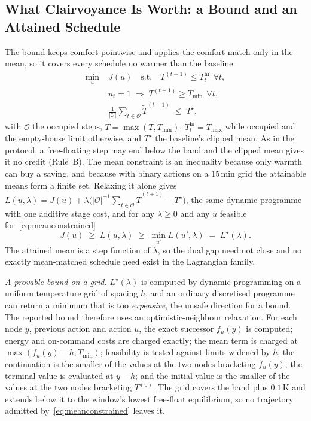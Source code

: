 \documentclass[pdflatex,sn-mathphys-num,iicol]{sn-jnl}
\theoremstyle{thmstyleone}\newtheorem{proposition}{Proposition}\newtheorem{corollary}{Corollary}
\theoremstyle{thmstyletwo}\newtheorem{remark}{Remark}\newtheorem{observation}{Observation}
\theoremstyle{thmstylethree}\newtheorem{definition}{Definition}
\newcommand{\Tmin}{T_{\min}}
\newcommand{\Tmax}{T_{\max}}
\begin{document}
\subsection{What Clairvoyance Is Worth: a Bound and an Attained Schedule}
\label{subsec:bound}

The bound keeps comfort pointwise and applies the comfort match only in the mean, so it covers every schedule no warmer than the baseline:
\begin{equation}
\begin{split}
  \min_{u}\;&J(u)\quad\text{s.t.}\quad
    T^{(t+1)}\le T^{\mathrm{hi}}_t\ \ \forall t,\\
  &u_t=1\;\Rightarrow\;T^{(t+1)}\ge\Tmin\ \ \forall t,\\
  &\tfrac{1}{|\mathcal{O}|}\textstyle\sum_{t\in\mathcal{O}}\tilde T^{(t+1)}
    \;\le\;T^{\star},
\end{split}
\label{eq:meanconstrained}
\end{equation}
with $\mathcal{O}$ the occupied steps, $\tilde T=\max(T,\Tmin)$, $T^{\mathrm{hi}}_t=\Tmax$ while occupied and the empty-house limit otherwise, and $T^{\star}$ the baseline's clipped mean. As in the protocol, a free-floating step may end below the band and the clipped mean gives it no credit (Rule~B). The mean constraint is an inequality because only warmth can buy a saving, and because with binary actions on a $15\,$min grid the attainable means form a finite set. Relaxing it alone gives $L(u,\lambda)=J(u)+\lambda\bigl(|\mathcal{O}|^{-1}\sum_{t\in\mathcal{O}}\tilde T^{(t+1)}-T^{\star}\bigr)$, the same dynamic programme with one additive stage cost, and for any $\lambda\ge0$ and any $u$ feasible for~\eqref{eq:meanconstrained}
\begin{equation}
  J(u)\;\ge\;L(u,\lambda)\;\ge\;\min_{u'}L(u',\lambda)\;=\;L^{\star}(\lambda).
  \label{eq:dual_bound}
\end{equation}
The attained mean is a step function of $\lambda$, so the dual gap need not close and no exactly mean-matched schedule need exist in the Lagrangian family.

\emph{A provable bound on a grid.} $L^{\star}(\lambda)$ is computed by dynamic programming on a uniform temperature grid of spacing $h$, and an ordinary discretised programme can return a minimum that is too \emph{expensive}, the unsafe direction for a bound. The reported bound therefore uses an optimistic-neighbour relaxation. For each node $y$, previous action and action $u$, the exact successor $f_u(y)$ is computed; energy and on-command costs are charged exactly; the mean term is charged at $\max(f_u(y)-h,\Tmin)$; feasibility is tested against limits widened by $h$; the continuation is the smaller of the values at the two nodes bracketing $f_u(y)$; the terminal value is evaluated at $y-h$; and the initial value is the smaller of the values at the two nodes bracketing $T^{(0)}$. The grid covers the band plus $0.1\,$K and extends below it to the window's lowest free-float equilibrium, so no trajectory admitted by~\eqref{eq:meanconstrained} leaves it.
\end{document}
